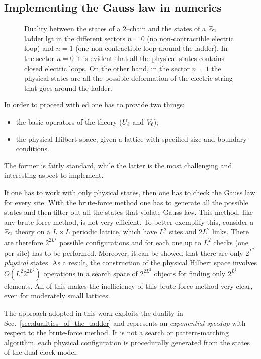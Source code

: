 \subsection{Implementing the Gauss law in numerics}%
\label{sub:implementing_the_gauss_law}

\begin{figure}[t]
    \centering
    
    \caption[Duality between clock states and ladder states]{Duality between the states of a $2$--chain and the states of a $\mathbb{Z}_2$ ladder \ac{lgt} in the different sectors $n=0$ (no non-contractible electric loop) and $n=1$ (one non-contractible loop around the ladder).
        In the sector $n=0$ it is evident that all the physical states contains closed electric loops.
        On the other hand, in the sector $n=1$ the physical states are all the possible deformation of the electric string that goes around the ladder.}
    \label{fig:z2_states}
\end{figure}


In order to proceed with \ac{ed} one has to provide two things:
\begin{itemize}
    \item the basic operators of the theory ($U_{\ell}$ and $V_{\ell}$);
    \item the physical Hilbert space, given a lattice with specified size and boundary conditions.
\end{itemize}
The former is fairly standard, while the latter is the most challenging and interesting aspect to implement.

If one has to work with only physical states, then one has to check the Gauss law for every site.
With the brute-force method one has to generate all the possible states and then filter out all the states that violate Gauss law.
This method, like any brute-force method, is not very efficient.
To better exemplify this, consider a $\mathbb{Z}_2$ theory on a $L \times L$ periodic lattice, which have $L^2$ sites and $2L^2$ links.
There are therefore $2^{2 L^2}$ possible configurations and for each one up to $L^2$ checks (one per site) has to be performed.
Moreover, it can be showed that there are only $2^{L^2}$ \emph{physical} states.
As a result, the construction of the physical Hilbert space involves $O(L^2 2^{2 L ^2})$ operations in a search space of $2^{2 L^2}$ objects for finding only $2^{L^2}$ elements.
All of this makes the inefficiency of this brute-force method very clear, even for moderately small lattices.


The approach adopted in this work exploits the duality in Sec.~\ref{sec:dualities_of_the_ladder} and represents an \emph{exponential speedup} with respect to the brute-force method.
It is not a search or pattern-matching algorithm, each physical configuration is procedurally generated from the states of the dual clock model.

